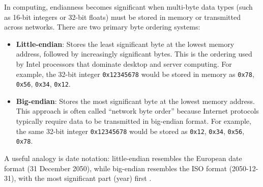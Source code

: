 In computing, endianness becomes significant when multi-byte data types (such as 16-bit integers or 32-bit floats) must be stored in memory or transmitted across networks. There are two primary byte ordering systems:

\begin{itemize}
  \item \textbf{Little-endian}: Stores the least significant byte at the lowest memory address, followed by increasingly significant bytes. This is the ordering used by Intel processors that dominate desktop and server computing. For example, the 32-bit integer \texttt{0x12345678} would be stored in memory as \texttt{0x78}, \texttt{0x56}, \texttt{0x34}, \texttt{0x12}.

  \item \textbf{Big-endian}: Stores the most significant byte at the lowest memory address. This approach is often called ``network byte order'' because Internet protocols typically require data to be transmitted in big-endian format. For example, the same 32-bit integer \texttt{0x12345678} would be stored as \texttt{0x12}, \texttt{0x34}, \texttt{0x56}, \texttt{0x78}.
\end{itemize}

A useful analogy is date notation: little-endian resembles the European date format (31 December 2050), while big-endian resembles the ISO format (2050-12-31), with the most significant part (year) first \citep{endianness_mdn}.






